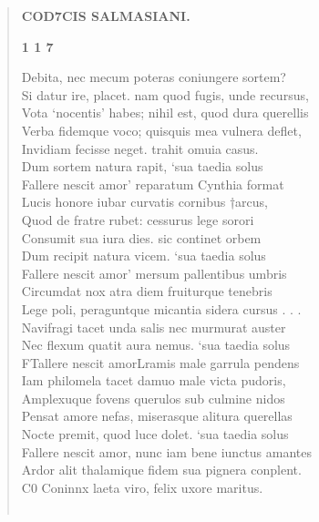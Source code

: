 \documentclass[11pt, a4paper]{report}
\begin{document}
\begin{verse}
    \begin{center} \textbf{COD7CIS SALMASIANI.} \end{center}\begin{center} \textbf{1 1 7} \end{center} \marginpar{[110]} Debita, nec mecum poteras coniungere sortem? \\ Si datur ire, placet. nam quod fugis, unde recursus, \\ Vota ‘nocentis’ habes; nihil est, quod dura querellis \\ Verba fidemque voco; quisquis mea vulnera deflet, \\ Invidiam fecisse neget. trahit omuia casus. \\ Dum sortem natura rapit, ‘sua taedia solus \\ Fallere nescit amor’ reparatum Cynthia format \\ Lucis honore iubar curvatis cornibus †arcus, \\ Quod de fratre rubet: cessurus lege sorori \\ Consumit sua iura dies. sic continet orbem \\ Dum recipit natura vicem. ‘sua taedia solus \\ Fallere nescit amor’ mersum pallentibus umbris \\ Circumdat nox atra diem fruiturque tenebris \\ Lege poli, peraguntque micantia sidera cursus . . . \\ Navifragi tacet unda salis nec murmurat auster \\ Nec flexum quatit aura nemus. ‘sua taedia solus \\ FTallere nescit amorLramis male garrula pendens \\ Iam philomela tacet damuo male victa pudoris, \\ Amplexuque fovens querulos sub culmine nidos \\ Pensat amore nefas, miserasque alitura querellas \\ Nocte premit, quod luce dolet. ‘sua taedia solus \\ Fallere nescit amor, nunc iam bene iunctus amantes \\ Ardor alit thalamique fidem sua pignera conplent. \\ C0 Coninnx laeta viro, felix uxore maritus. \\ 
        ﻿\pagebreak 

\end{verse}
\end{document}
